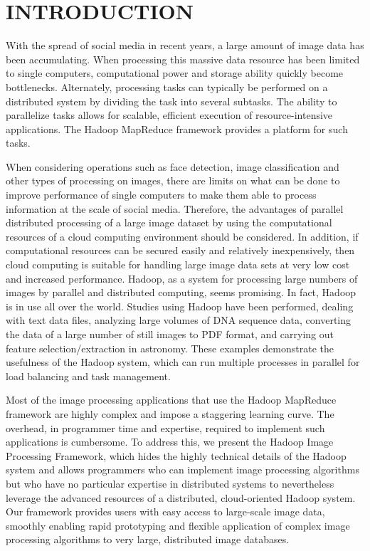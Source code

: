 
\chapter{INTRODUCTION}
With the spread of social media in recent years, a large amount of
image data has been accumulating. When processing this massive data
resource has been limited to single computers, computational power and
storage ability quickly become bottlenecks. Alternately, processing
tasks can typically be performed on a distributed system by dividing
the task into several subtasks. The ability to parallelize tasks
allows for scalable, efficient execution of resource-intensive
applications.  The Hadoop MapReduce framework provides a platform for
such tasks.

When considering operations such as face detection, image
classification\cite{Li2009} and other types of processing on images,
there are limits on what can be done to improve performance of single
computers to make them able to process information at the scale of
social media. Therefore, the advantages of parallel distributed
processing of a large image dataset by using the computational
resources of a cloud computing environment should be considered. In
addition, if computational resources can be secured easily and
relatively inexpensively, then cloud computing is suitable for
handling large image data sets at very low cost and increased
performance. Hadoop, as a system for processing large numbers of
images by parallel and distributed computing, seems promising. In
fact, Hadoop is in use all over the world. Studies using Hadoop have
been performed, dealing with text data files\cite{Lin2010}, analyzing
large volumes of DNA sequence data\cite{McKenna2010}, converting the
data of a large number of still images to PDF format, and carrying out
feature selection/extraction in astronomy\cite{wiley2011}.  These
examples demonstrate the usefulness of the Hadoop system, which can
run multiple processes in parallel for load balancing and task
management.

Most of the image processing applications that use the Hadoop
MapReduce framework are highly complex and impose a staggering
learning curve.  The overhead, in programmer time and expertise,
required to implement such applications is cumbersome.  To address
this, we present the Hadoop Image Processing Framework, which hides
the highly technical details of the Hadoop system and allows
programmers who can implement image processing algorithms but who have
no particular expertise in distributed systems to nevertheless
leverage the advanced resources of a distributed, cloud-oriented
Hadoop system. Our framework provides users with easy access to
large-scale image data, smoothly enabling rapid prototyping and
flexible application of complex image processing algorithms to very
large, distributed image databases.

